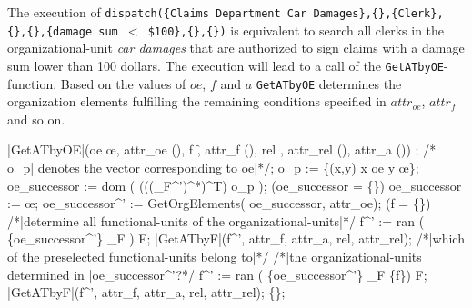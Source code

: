 \noindent The execution of {\tt dispatch(\{Claims Department Car Damages\},\{\},\{Clerk\},\\ \{\},\{\},\{damage sum $<$ \$100\},\{\},\{\})} is equivalent to search all clerks in the organizational-unit {\it car damages} that are authorized to sign claims with a damage sum lower than 100 dollars. The execution will lead to a call of the {\tt GetATbyOE}-function. Based on the values of $oe$, $f$ and $a$ {\tt GetATbyOE} determines the organization elements fulfilling the remaining conditions specified in $attr_{oe}$, $attr_{f}$ and so on.

	\begin{samepage}
	{\small
	\NumberProgramstrue
	\begin{algorithm}[GetATbyOE]\label{alg:GetATbyOE}
	\begin{program}
	\FUNCT |GetATbyOE|(oe \subset \oe, attr_{oe} \subset (\Bezeichner \times \WerteMenge), f \subset \f,
	attr_{f} \subset (\Bezeichner \times \WerteMenge), rel \in \relname, attr_{rel} \subset (\Bezeichner \times \WerteMenge),
	attr_a \subset (\Bezeichner \times \WerteMenge)) \subset \a
	\BEGIN
	\var {};
	/* o_{p}| denotes the vector corresponding to oe|*/;
	o_{p} := \{(x,y) \vert x \in oe \wedge y \in \oe \};\label{alg:GetATbyOE:Vektor}
	oe_{successor} := dom \left( \left({\left({\left({\relstrukturOE_F}^{'}\right)}^{*}\right)}^{T}\right) \circ o_{p} \right);\label{alg:GetATbyOE:Nachfolger}
	\IF (oe_{successor} = \{\})
	\THEN oe_{successor} := \oe; \label{alg:GetATbyOE:kritisch2}
	\FI
	oe_{successor}^{'} := GetOrgElements( oe_{successor}, attr_{oe});
	\IF (f = \{\})\label{alg:GetATbyOE:fIstNull}
	\THEN
		/*|determine all functional-units of the organizational-units|*/
		f^{'} := ran ( \{oe_{successor}^{'}\} \lhd \relstrukturOE_F ) \cap F;
		\RETURN \quad |GetATbyF|(f^{'}, attr_{f}, attr_a, rel, attr_{rel});
	\ELSE \label{alg:GetATbyOE:fIstNichtNull}
		/*|which of the preselected functional-units belong to|*/
		/*|the organizational-units determined in |oe_{successor}^{'}?*/
		f^{'} := ran ( \{oe_{successor}^{'}\} \lhd \relstrukturOE_F \rhd \{f\}) \cap F;
		\RETURN \quad |GetATbyF|(f^{'}, attr_{f}, attr_a, rel, attr_{rel});
	\FI
	\RETURN \quad \{\};
	\END
	\end{program}
	\end{algorithm}
	\NumberProgramsfalse
	}
	\end{samepage}

